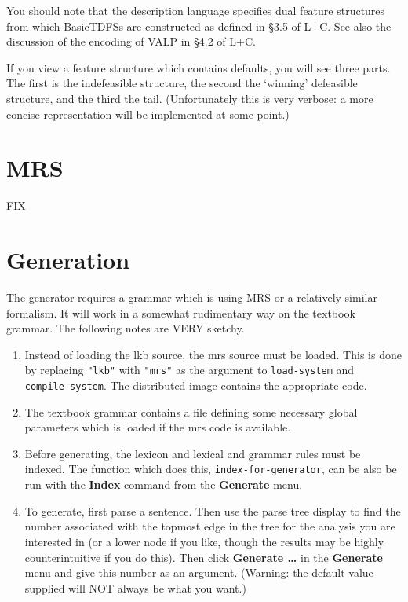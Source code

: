 \documentclass[12pt]{report}
\begin{document}
You should note that the description language specifies
dual feature structures from which
BasicTDFSs are constructed
as defined in \S 3.5 of L+C.  See also the discussion of the encoding
of VALP in \S 4.2 of L+C.

If you view a feature structure which contains defaults,
you will see three parts.  The first is the indefeasible structure,
the second the `winning' defeasible structure, and the third 
the tail.  (Unfortunately this is very verbose: a more concise 
representation will be implemented at some point.)

\section{MRS}
\label{mrs}

FIX

\section{Generation}
\label{generator}

The generator requires a grammar which is using MRS or a relatively
similar formalism.  It will work in a somewhat rudimentary way on the
textbook grammar.  The following notes are VERY sketchy.
\begin{enumerate}
\item Instead of loading the lkb source, the mrs source must be loaded.  This
is done by replacing {\tt "lkb"} with {\tt "mrs"} as the argument to
{\tt load-system} and {\tt compile-system}.  The distributed image 
contains the appropriate code.  
\item The textbook grammar contains a file defining some necessary
global parameters which is loaded if the mrs code is available.
\item Before generating, the lexicon and lexical and grammar rules
must be indexed.  The function which does this, {\tt index-for-generator},
can be also be run with the {\bf Index} command
from the {\bf Generate} menu.
\item To generate, first parse a sentence.  
Then use the parse tree display to find the number associated with the topmost
edge in the tree for the analysis you are interested in
(or a lower node if you like, though the results may be
highly counterintuitive if you do this).  Then
click {\bf Generate \ldots} in the {\bf Generate} menu and give this
number as an argument.  (Warning: the default value supplied will NOT
always be what you want.)
\end{enumerate}
\end{document}
